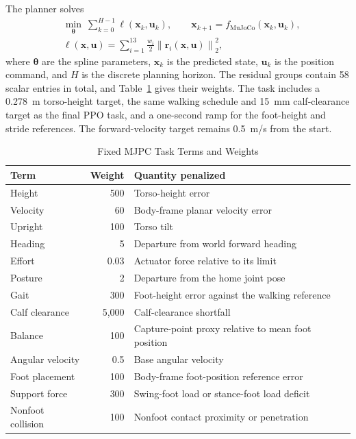\documentclass[conference]{IEEEtran}
\begin{document}
The planner solves
\begin{equation}
\begin{aligned}
&\min_{\boldsymbol\theta}\ \sum_{k=0}^{H-1}\ell(\mathbf x_k,\mathbf u_k),\qquad
\mathbf x_{k+1}=f_{\mathrm{MuJoCo}}(\mathbf x_k,\mathbf u_k),\\
&\ell(\mathbf x,\mathbf u)=\sum_{i=1}^{13}\frac{w_i}{2}\left\|\mathbf r_i(\mathbf x,\mathbf u)\right\|_2^2,
\end{aligned}
\label{eq:mpc}
\end{equation}
where $\boldsymbol\theta$ are the spline parameters, $\mathbf x_k$ is the predicted state, $\mathbf u_k$ is the position command, and $H$ is the discrete planning horizon. The residual groups contain 58 scalar entries in total, and Table~\ref{tab:mjpc} gives their weights. The task includes a 0.278~m torso-height target, the same walking schedule and 15~mm calf-clearance target as the final PPO task, and a one-second ramp for the foot-height and stride references. The forward-velocity target remains 0.5~m/s from the start.

\begin{table}[htbp]
\caption{Fixed MJPC Task Terms and Weights}
\begin{center}
\footnotesize
\begin{tabular}{|l|r|p{3.9cm}|}
\hline
\textbf{Term} & \textbf{Weight} & \textbf{Quantity penalized} \\
\hline
Height & 500 & Torso-height error \\
Velocity & 60 & Body-frame planar velocity error \\
Upright & 100 & Torso tilt \\
Heading & 5 & Departure from world forward heading \\
Effort & 0.03 & Actuator force relative to its limit \\
Posture & 2 & Departure from the home joint pose \\
Gait & 300 & Foot-height error against the walking reference \\
Calf clearance & 5,000 & Calf-clearance shortfall \\
Balance & 100 & Capture-point proxy relative to mean foot position \\
Angular velocity & 0.5 & Base angular velocity \\
Foot placement & 100 & Body-frame foot-position reference error \\
Support force & 300 & Swing-foot load or stance-foot load deficit \\
Nonfoot collision & 100 & Nonfoot contact proximity or penetration \\
\hline
\end{tabular}
\label{tab:mjpc}
\end{center}
\end{table}
\end{document}
